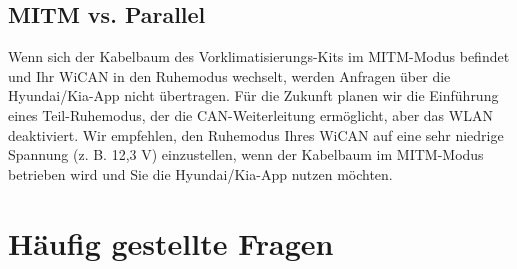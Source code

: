 \documentclass[superscriptaddress,onecolumn,floatfix]{revtex4-2}
\begin{document}
\subsection{MITM vs. Parallel}
Wenn sich der Kabelbaum des Vorklimatisierungs-Kits im MITM-Modus befindet und Ihr WiCAN in den Ruhemodus wechselt, werden Anfragen über die Hyundai/Kia-App nicht übertragen. Für die Zukunft planen wir die Einführung eines Teil-Ruhemodus, der die CAN-Weiterleitung ermöglicht, aber das WLAN deaktiviert. Wir empfehlen, den Ruhemodus Ihres WiCAN auf eine sehr niedrige Spannung (z. B. 12,3 V) einzustellen, wenn der Kabelbaum im MITM-Modus betrieben wird und Sie die Hyundai/Kia-App nutzen möchten. 

\section{Häufig gestellte Fragen}
\end{document}
